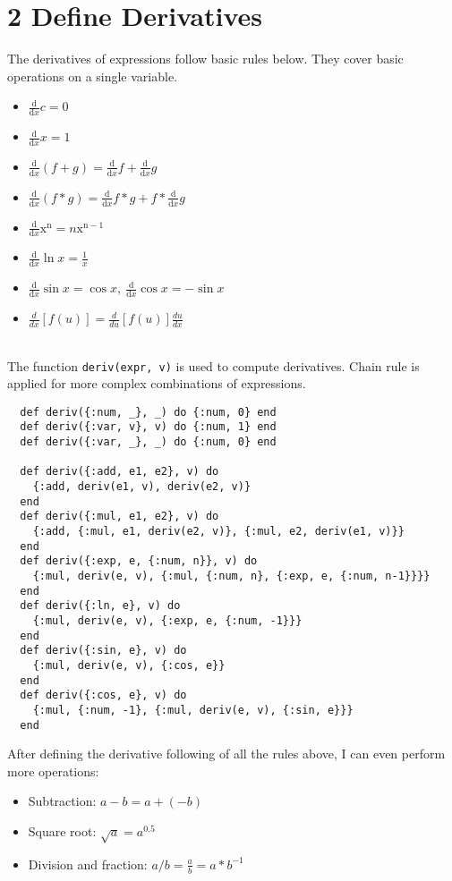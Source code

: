 \documentclass[a4paper,11pt]{article}
\begin{document}
\section*{2 Define Derivatives}
The derivatives of expressions follow basic rules below. They cover basic operations on a single variable.
\begin{itemize}
\item $ \frac{\mathrm{d}}{\mathrm{d}x}c = 0 $
\item $ \frac{\mathrm{d}}{\mathrm{d}x}x = 1 $
\item $ \frac{\mathrm{d}}{\mathrm{d}x}(f + g) = \frac{\mathrm{d}}{\mathrm{d}x}f + \frac{\mathrm{d}}{\mathrm{d}x}g $
\item $ \frac{\mathrm{d}}{\mathrm{d}x}(f * g) = \frac{\mathrm{d}}{\mathrm{d}x}f * g + f * \frac{\mathrm{d}}{\mathrm{d}x}g $
\item $ \frac{\mathrm{d}}{\mathrm{d}x}\mathrm{x^n} = n\mathrm{x^{n-1}} $
\item $ \frac{\mathrm{d}}{\mathrm{d}x}\ln{x} = \frac{1}{x} $
\item $ \frac{\mathrm{d}}{\mathrm{d}x}\sin{x} = \cos{x},\ \frac{\mathrm{d}}{\mathrm{d}x}\cos{x} = -\sin{x}$
\item $\frac{d}{{dx}}\left[ {f\left( u \right)} \right] = \frac{d}{{du}}\left[ {f\left( u \right)} \right]\frac{{du}}{{dx}}$
\end{itemize}
\\
The function {\tt deriv(expr, v)} is used to compute derivatives. Chain rule is applied for more complex combinations of expressions.
\begin{verbatim}
  def deriv({:num, _}, _) do {:num, 0} end
  def deriv({:var, v}, v) do {:num, 1} end
  def deriv({:var, _}, _) do {:num, 0} end

  def deriv({:add, e1, e2}, v) do
    {:add, deriv(e1, v), deriv(e2, v)}
  end
  def deriv({:mul, e1, e2}, v) do
    {:add, {:mul, e1, deriv(e2, v)}, {:mul, e2, deriv(e1, v)}}
  end
  def deriv({:exp, e, {:num, n}}, v) do
    {:mul, deriv(e, v), {:mul, {:num, n}, {:exp, e, {:num, n-1}}}}
  end
  def deriv({:ln, e}, v) do
    {:mul, deriv(e, v), {:exp, e, {:num, -1}}}
  end
  def deriv({:sin, e}, v) do
    {:mul, deriv(e, v), {:cos, e}}
  end
  def deriv({:cos, e}, v) do
    {:mul, {:num, -1}, {:mul, deriv(e, v), {:sin, e}}}
  end
\end{verbatim}
After defining the derivative following of all the rules above, I can even perform more operations:
\begin{itemize}
  \item Subtraction: $a - b = a + (-b)$
  \item Square root: $\sqrt{a} = a^{0.5}$
  \item Division and fraction: $a / b = \frac{a}{b} = a * b^{-1}$
\end{itemize}
\end{document}
